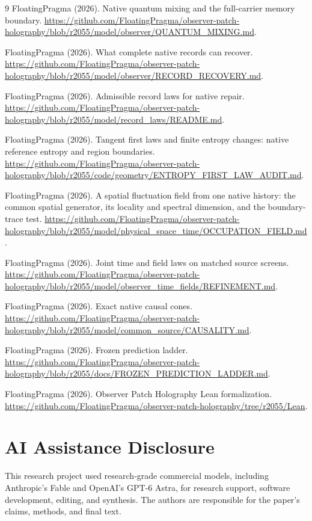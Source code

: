 \documentclass[11pt]{article}
\theoremstyle{remark}
\begin{document}
\begin{thebibliography}{9}
FloatingPragma (2026). Native quantum mixing and the full-carrier memory
boundary.
\url{https://github.com/FloatingPragma/observer-patch-holography/blob/r2055/model/observer/QUANTUM_MIXING.md}.

FloatingPragma (2026). What complete native records can recover.
\url{https://github.com/FloatingPragma/observer-patch-holography/blob/r2055/model/observer/RECORD_RECOVERY.md}.

FloatingPragma (2026). Admissible record laws for native repair.
\url{https://github.com/FloatingPragma/observer-patch-holography/blob/r2055/model/record_laws/README.md}.

FloatingPragma (2026). Tangent first laws and finite entropy changes:
native reference entropy and region boundaries.
\url{https://github.com/FloatingPragma/observer-patch-holography/blob/r2055/code/geometry/ENTROPY_FIRST_LAW_AUDIT.md}.

FloatingPragma (2026). A spatial fluctuation field from one native history:
the common spatial generator, its locality and spectral dimension, and the
boundary-trace test.
\url{https://github.com/FloatingPragma/observer-patch-holography/blob/r2055/model/physical_space_time/OCCUPATION_FIELD.md}.

FloatingPragma (2026). Joint time and field laws on matched source screens.
\url{https://github.com/FloatingPragma/observer-patch-holography/blob/r2055/model/observer_time_fields/REFINEMENT.md}.

FloatingPragma (2026). Exact native causal cones.
\url{https://github.com/FloatingPragma/observer-patch-holography/blob/r2055/model/common_source/CAUSALITY.md}.

FloatingPragma (2026). Frozen prediction ladder.
\url{https://github.com/FloatingPragma/observer-patch-holography/blob/r2055/docs/FROZEN_PREDICTION_LADDER.md}.

FloatingPragma (2026). Observer Patch Holography Lean formalization.
\url{https://github.com/FloatingPragma/observer-patch-holography/tree/r2055/Lean}.

\end{thebibliography}

\section*{AI Assistance Disclosure}
This research project used research-grade commercial models, including
Anthropic's Fable and OpenAI's GPT-6 Astra, for research support, software
development, editing, and synthesis. The authors are responsible for the
paper's claims, methods, and final text.
\end{document}
